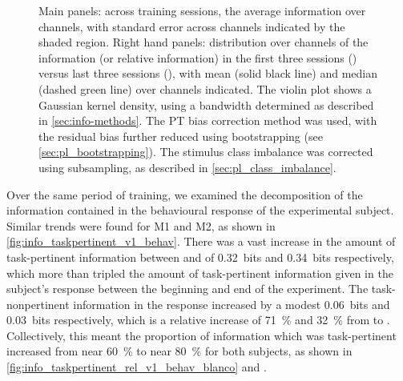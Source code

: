 \begin{figure}[htbp]
{Main panels: across training sessions, the average information over channels, with standard error across channels indicated by the shaded region.
Right hand panels: distribution over channels of the information (or relative information) in the first three sessions () versus last three sessions (), with mean (solid black line) and median (dashed green line) over channels indicated.
The violin plot shows a Gaussian kernel density, using a bandwidth determined as described in \autoref{sec:info-methods}.
The \ac{PT} bias correction method was used, with the residual bias further reduced using bootstrapping (see \autoref{sec:pl_bootstrapping}).
The stimulus class imbalance was corrected using subsampling, as described in \autoref{sec:pl_class_imbalance}.
    \label{fig:info_taskpertinent_v1_ch}
}
\end{figure}


Over the same period of training, we examined the decomposition of the information contained in the behavioural response of the experimental subject.
Similar trends were found for \ac{M1} and \ac{M2}, as shown in \autoref{fig:info_taskpertinent_v1_behav}.
There was a vast increase in the amount of task-pertinent information between  and  of \SI{+0.32}{bits} and \SI{+0.34}{bits} respectively, which more than tripled the amount of task-pertinent information given in the subject's response between the beginning and end of the experiment.
The task-nonpertinent information in the response increased by a modest \SI{+0.06}{bits} and \SI{+0.03}{bits} respectively, which is a relative increase of \SI{71}{\percent} and \SI{32}{\percent} from  to .
Collectively, this meant the proportion of information which was task-pertinent increased from near \SI{60}{\percent} to near \SI{80}{\percent} for both subjects, as shown in \autoref{fig:info_taskpertinent_rel_v1_behav_blanco} and .

%

